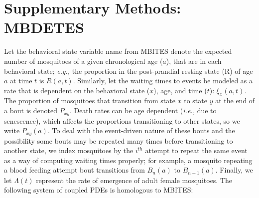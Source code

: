 \documentclass{article}
\begin{document}

\newcommand{\eg}{{\em e.g., }}
\newcommand{\ie}{{\em i.e., }}


\section{Supplementary Methods: MBDETES}

Let the behavioral state variable name from MBITES denote the expected number of mosquitoes of a given chronological age ($a$), that are in each behavioral state; \eg the proportion in the post-prandial resting state (R) of age $a$ at time $t$ is $R(a,t)$. Similarly, let the waiting times to events be modeled as a rate that is dependent on the behavioral state ($x$), age, and time ($t$): $\xi_x(a,t)$. The proportion of mosquitoes that transition from state $x$ to state $y$ at the end of a bout is denoted $P_{xy}$. Death rates can be age dependent (\ie due to senescence), which affects the proportions transitioning to other states, so we write $P_{xy}(a)$. To deal with the event-driven nature of these bouts and the possibility some bouts may be repeated many times before transitioning to another state, we index mosquitoes by the $i^{th}$ attempt to repeat the same event as a way of computing waiting times properly; for example, a mosquito repeating a blood feeding attempt bout transitions from $B_n(a)$ to $B_{n+1}(a)$. Finally, we let $\Lambda(t)$ represent the rate of emergence of adult female mosquitoes. The following system of coupled PDEs is homologous to MBITES: 
\end{document}
